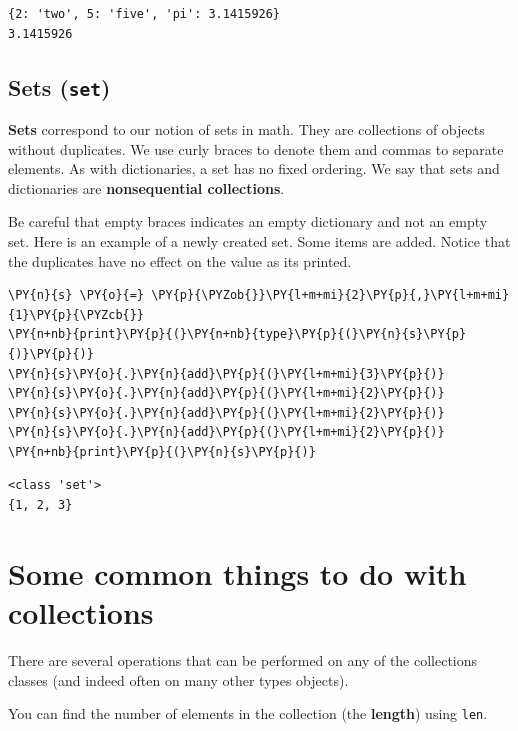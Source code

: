 \begin{Verbatim}
{2: 'two', 5: 'five', 'pi': 3.1415926}
3.1415926
\end{Verbatim}

\subsection{Sets (\texttt{set})}


\textbf{Sets} correspond to our notion of sets in math.  They are collections of objects without duplicates.  We use curly braces to denote them and commas to separate elements.  As with dictionaries, a set has no fixed ordering.  We say that sets and dictionaries are \textbf{nonsequential collections}.


Be careful that empty braces \texttt{{}} indicates an empty dictionary and not an empty set.  Here is an example of a newly created set.  Some items are added.  Notice that the duplicates have no effect on the value as its printed.


\begin{Verbatim}[commandchars=\\\{\}]
\PY{n}{s} \PY{o}{=} \PY{p}{\PYZob{}}\PY{l+m+mi}{2}\PY{p}{,}\PY{l+m+mi}{1}\PY{p}{\PYZcb{}}
\PY{n+nb}{print}\PY{p}{(}\PY{n+nb}{type}\PY{p}{(}\PY{n}{s}\PY{p}{)}\PY{p}{)}
\PY{n}{s}\PY{o}{.}\PY{n}{add}\PY{p}{(}\PY{l+m+mi}{3}\PY{p}{)}
\PY{n}{s}\PY{o}{.}\PY{n}{add}\PY{p}{(}\PY{l+m+mi}{2}\PY{p}{)}
\PY{n}{s}\PY{o}{.}\PY{n}{add}\PY{p}{(}\PY{l+m+mi}{2}\PY{p}{)}
\PY{n}{s}\PY{o}{.}\PY{n}{add}\PY{p}{(}\PY{l+m+mi}{2}\PY{p}{)}
\PY{n+nb}{print}\PY{p}{(}\PY{n}{s}\PY{p}{)}
\end{Verbatim}

\begin{Verbatim}
<class 'set'>
{1, 2, 3}
\end{Verbatim}

\section{Some common things to do with collections}


There are several operations that can be performed on any of the collections classes (and indeed often on many other types objects).


You can find the number of elements in the collection (the \textbf{length}) using \texttt{len}.


